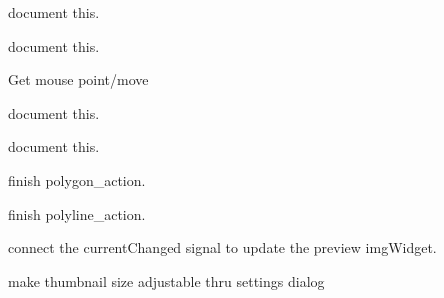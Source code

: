 \begin{DoxyRefList}
%
document this.  
\item[Member \mbox{\hyperlink{imgui__main_8c_a59c3cf8b0862a693755b117365055eaa}{paste\+\_\+action}} (void)]\label{todo__todo000114}%
%
document this.  
\item[Member \mbox{\hyperlink{imgui__main_8c_a06a4dd5f19b0327917ec50daf98b8c57}{paste\+\_\+selected}} (void)]\label{todo__todo000158}%
%
Get mouse point/move  
\item[Member \mbox{\hyperlink{imgui__main_8c_a05199e8a973414ddc53073d4fcf16b01}{pattern\+\_\+view}} (void)]\label{todo__todo000081}%
%
document this.  
\item[Member \mbox{\hyperlink{imgui__main_8c_ad37c25f1f6b31615c1cc03377ff88676}{pick\+Add\+Mode\+Toggled}} (void)]\label{todo__todo000171}%
%
document this.  
\item[Member \mbox{\hyperlink{imgui__main_8c_af4def00971243cdeea8f9705a6e64b30}{polygon\+\_\+action}} (void)]\label{todo__todo000151}%
%
finish polygon\+\_\+action.  
\item[Member \mbox{\hyperlink{imgui__main_8c_a8aff00f850489a80974f29458d113d46}{polyline\+\_\+action}} (Emb\+Vector start, Emb\+Path $\ast$p, int rubber\+Mode)]\label{todo__todo000152}%
%
finish polyline\+\_\+action.  
\item[Member \mbox{\hyperlink{imgui__main_8c_a0874fa8b4d857b5527c706a3fce40e0f}{preview\+\_\+dialog}} (void)]\label{todo__todo000024}%
%
connect the current\+Changed signal to update the preview img\+Widget. 

\label{todo__todo000023}%
%
make thumbnail size adjustable thru settings dialog


\end{DoxyRefList}
